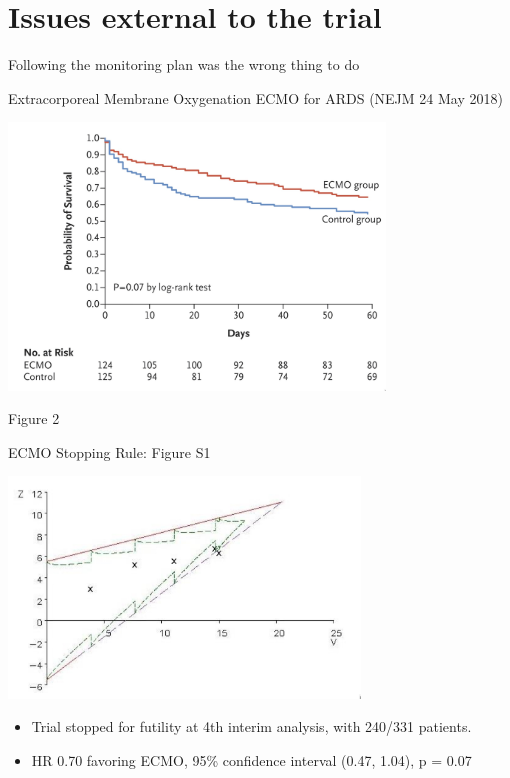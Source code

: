 \documentclass[ignorenonframetext,]{beamer}
\begin{document}
\hypertarget{issues-external-to-the-trial}{%
\section{Issues external to the
trial}\label{issues-external-to-the-trial}}

\begin{frame}{%
\protect\hypertarget{following-the-monitoring-plan-was-the-wrong-thing-to-do}{%
Following the monitoring plan was the wrong thing to do}}

Extracorporeal Membrane Oxygenation ECMO for ARDS (NEJM 24 May 2018)

\includegraphics[width=0.75\textwidth,height=\textheight]{./figures/ecmo_survival.jpeg}

Figure 2

\end{frame}

\begin{frame}{%
\protect\hypertarget{ecmo-stopping-rule-figure-s1}{%
ECMO Stopping Rule: Figure S1}}

\includegraphics[width=0.7\textwidth,height=\textheight]{./figures/ecmo_monitoring.jpeg}

\begin{itemize}
\item
  Trial stopped for futility at 4th interim analysis, with 240/331
  patients.
\item
  HR 0.70 favoring ECMO, 95\% confidence interval (0.47, 1.04), p = 0.07
\end{itemize}

\end{frame}
\end{document}
